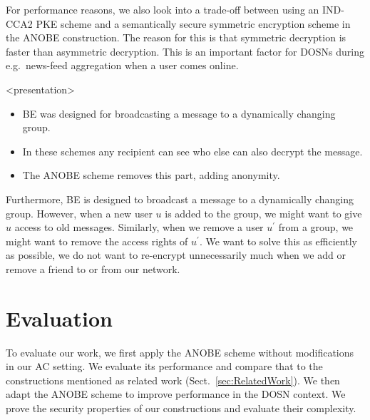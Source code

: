 For performance reasons, we also look into a trade-off between using an 
IND-CCA2 \ac{PKE} scheme and a semantically secure symmetric encryption scheme 
in the \ac{ANOBE} construction.
The reason for this is that symmetric decryption is faster than asymmetric 
decryption.
This is an important factor for \acp{DOSN} during e.g.~news-feed aggregation 
when a user comes online.

\begin{frame}<presentation>
  \begin{itemize}
    \item \ac{BE} was designed for broadcasting a message to a dynamically 
      changing group.

    \item In these schemes any recipient can see who else can also decrypt the 
      message.

    \item The \ac{ANOBE} scheme removes this part, adding anonymity.

  \end{itemize}
\end{frame}

Furthermore, \ac{BE} is designed to broadcast a message to a dynamically 
changing group.
However, when a new user \(u\) is added to the group, we might want to give 
\(u\) access to old messages.
Similarly, when we remove a user \(u^\prime\) from a group, we might want to 
remove the access rights of \(u^\prime\).
We want to solve this as efficiently as possible, we do not want to re-encrypt 
unnecessarily much when we add or remove a friend to or from our network.


\section{Evaluation}\label{sec:Evaluation}

To evaluate our work, we first apply the \ac{ANOBE} scheme without 
modifications in our \ac{AC} setting.
We evaluate its performance and compare that to the constructions mentioned as 
related work (Sect.~\ref{sec:RelatedWork}).
We then adapt the \ac{ANOBE} scheme to improve performance in the \ac{DOSN} 
context.
We prove the security properties of our constructions and evaluate their 
complexity.

